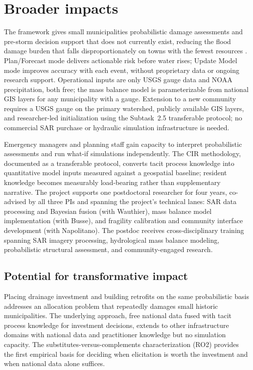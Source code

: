 \documentclass[11pt]{article}
\begin{document}

\section{Broader impacts}

The framework gives small municipalities probabilistic damage assessments and
pre-storm decision support that does not currently exist, reducing the flood
damage burden that falls disproportionately on towns with the fewest resources
\cite{wilson2021flood}.
Plan/Forecast mode delivers actionable risk before water rises; Update Model mode
improves accuracy with each event, without proprietary data or ongoing research
support.
Operational inputs are only USGS gauge data and NOAA precipitation, both free;
the mass balance model is parameterizable from national GIS layers for any
municipality with a gauge.
Extension to a new community requires a USGS gauge on the primary watershed, publicly available GIS layers, and researcher-led initialization using the Subtask~2.5 transferable protocol; no commercial SAR purchase or hydraulic simulation infrastructure is needed.

Emergency managers and planning staff gain capacity to interpret probabilistic
assessments and run what-if simulations independently.
The CIR methodology, documented as a transferable protocol, converts tacit process
knowledge into quantitative model inputs measured against a geospatial baseline;
resident knowledge becomes measurably load-bearing rather than supplementary
narrative.
The project supports one postdoctoral researcher for four years, co-advised by all three PIs and spanning the project's technical lanes: SAR data processing and Bayesian fusion (with Wauthier), mass balance model implementation (with Busse), and fragility calibration and community interface development (with Napolitano). The postdoc receives cross-disciplinary training spanning SAR imagery processing, hydrological mass balance modeling, probabilistic structural assessment, and community-engaged research.

\vspace{-10pt}
\subsection{Potential for transformative impact}
Placing drainage investment and building retrofits on the same probabilistic basis
addresses an allocation problem that repeatedly damages small historic
municipalities. The underlying approach, free national data fused with
tacit process knowledge for investment decisions, extends to other infrastructure
domains with national data and practitioner knowledge but no simulation capacity.
The substitutes-versus-complements
characterization (RO2) provides the first empirical basis for deciding when
elicitation is worth the investment and when national data alone suffices.
\end{document}
